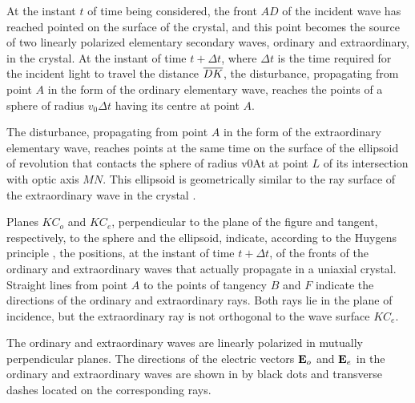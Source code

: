 At the instant $t$ of time being considered, the front $AD$ of the incident wave has reached pointed on the surface of the crystal, and this point becomes the source of two linearly polarized elementary secondary waves, ordinary and extraordinary, in the crystal. At the instant of time $t + \Delta t$, where $\Delta t$ is the time required for the incident light to travel the distance $\overline{DK}$, the
disturbance, propagating from point $A$ in the form of the ordinary elementary wave, reaches the points of a sphere of radius $v_{0}\Delta t$ having its centre at point $A$. 

The disturbance, propagating from point $A$ in the form of the extraordinary elementary wave, reaches points at the same time on the surface of the ellipsoid of revolution that contacts the sphere of radius v0At at point $L$ of its intersection with optic axis $MN$. This ellipsoid is geometrically
similar to the ray surface of the extraordinary wave in
the crystal . 

Planes $KC_{o}$ and $KC_{e}$, perpendicular to the plane of the figure and tangent, respectively, to the sphere and the ellipsoid, indicate, according to the Huygens principle , the positions, at the instant of time $t + \Delta t$, of the fronts of the ordinary and extraordinary waves that actually propagate in a uniaxial crystal. Straight lines from point $A$ to the points of tangency $B$ and $F$ indicate the directions of the ordinary and extraordinary rays. Both rays lie in the plane of incidence, but the extraordinary ray is not orthogonal to the wave surface $KC_{e}$. 

The ordinary and extraordinary waves are linearly polarized in mutually perpendicular planes. The directions of the electric vectors $\vb{E}_{o}$ and $\vb{E}_{e}$ in the ordinary and extraordinary waves are shown in  by black dots and transverse dashes located on the corresponding rays.


